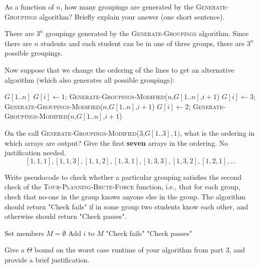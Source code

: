\documentclass[11pt,fleqn]{exam}
\newif\ifsolutions\solutionsfalse
\newenvironment{soln}{\color{solnblue}}{}
\begin{document}
\begin{questions}
\question[2]
As a function of $n$, how many groupings are generated by the \textsc{Generate-Groupings} algorithm? Briefly explain your answer (one short sentence).

\begin{soln}
	There are $3^n$ groupings generated by the \textsc{Generate-Groupings} algorithm.
	Since there are $n$ students and each student can be in one of three groups, there are $3^n$ possible groupings.
\end{soln}

\ifsolutions

\fi

\question[3]
Now suppose that we change the ordering of the lines to get an alternative algorithm (which also generates all possible groupings):

\begin{algorithmic}
    \Return $G[1..n]$
\Else
   \State $G[i] \gets 1$; \textsc{Generate-Groupings-Modified}($n$,$G[1..n]$,$i+1$)
   \State $G[i] \gets 3$; \textsc{Generate-Groupings-Modified}($n$,$G[1..n]$,$i+1$)
   \State $G[i] \gets 2$; \textsc{Generate-Groupings-Modified}($n$,$G[1..n]$,$i+1$)
\EndIf
   \EndFunction
\end{algorithmic}
On the call \textsc{Generate-Groupings-Modified}(3,$G[1..3],1)$,
what is the ordering in which arrays are output?
Give the first {\bf seven} arrays in the ordering. No justification needed.
\begin{soln}
	\[ [1,1,1], [1,1,3], [1,1,2], [1,3,1], [1,3,3], [1,3,2], [1,2,1], \dots \]
\end{soln}
\ifsolutions

\fi

\question[4]
Write pseudocode to check whether a particular grouping satisfies the 
second check of the \textsc{Tour-Planning-Brute-Force} 
function, i.e., that for each group, check that no-one in the group 
knows anyone else in the group. The algorithm should return "Check fails" 
if in some group two students know each other, and otherwise should return "Check passes".

\ifsolutions

\else
\begin{soln}
	\begin{algorithmic}
	\State Set members $M = \emptyset$
			\State Add $i$ to $M$
		\EndIf
	\EndFor
				\Return "Check fails"
			\EndIf 
		\EndFor 
	\EndFor 
\EndFor
\State \Return "Check passes"
\EndFunction
\end{algorithmic}
\end{soln}
\fi
\question[2]
Give a $\Theta$ bound on the worst case runtime of your algorithm from part 3, 
and provide a brief justification. 


\end{questions}
\end{document}
